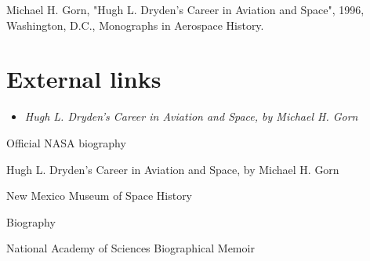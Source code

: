 Michael H. Gorn, "Hugh L. Dryden's Career in Aviation and Space", 1996,
Washington, D.C., Monographs in Aerospace History.

\section{External links}\label{external-links}

\begin{itemize}
\item
  \emph{Hugh L. Dryden's Career in Aviation and Space, by Michael H.
  Gorn}
\end{itemize}

Official NASA biography

Hugh L. Dryden's Career in Aviation and Space, by Michael H. Gorn

New Mexico Museum of Space History

Biography

National Academy of Sciences Biographical Memoir
